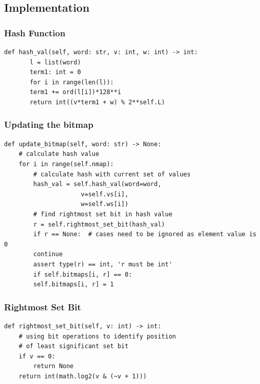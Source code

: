 \documentclass[11pt]{article}
\begin{document}
\subsection*{Implementation}
\label{sec:org4001509}
\subsubsection*{Hash Function}
\label{sec:org012b0d4}
\begin{verbatim}
def hash_val(self, word: str, v: int, w: int) -> int:
       l = list(word)
       term1: int = 0
       for i in range(len(l)):
	   term1 += ord(l[i])*128**i
       return int((v*term1 + w) % 2**self.L)
\end{verbatim}

\subsubsection*{Updating the bitmap}
\label{sec:org87bea05}
\begin{verbatim}
def update_bitmap(self, word: str) -> None:
	# calculate hash value
	for i in range(self.nmap):
	    # calculate hash with current set of values
	    hash_val = self.hash_val(word=word,
				     v=self.vs[i],
				     w=self.ws[i])
	    # find rightmost set bit in hash value
	    r = self.rightmost_set_bit(hash_val)
	    if r == None:  # cases need to be ignored as element value is 0
		continue
	    assert type(r) == int, 'r must be int'
	    if self.bitmaps[i, r] == 0:
		self.bitmaps[i, r] = 1
\end{verbatim}

\subsubsection*{Rightmost Set Bit}
\label{sec:org19349d9}
\begin{verbatim}
def rightmost_set_bit(self, v: int) -> int:
	# using bit operations to identify position
	# of least significant set bit
	if v == 0:
	    return None
	return int(math.log2(v & (~v + 1)))
\end{verbatim}
\end{document}
